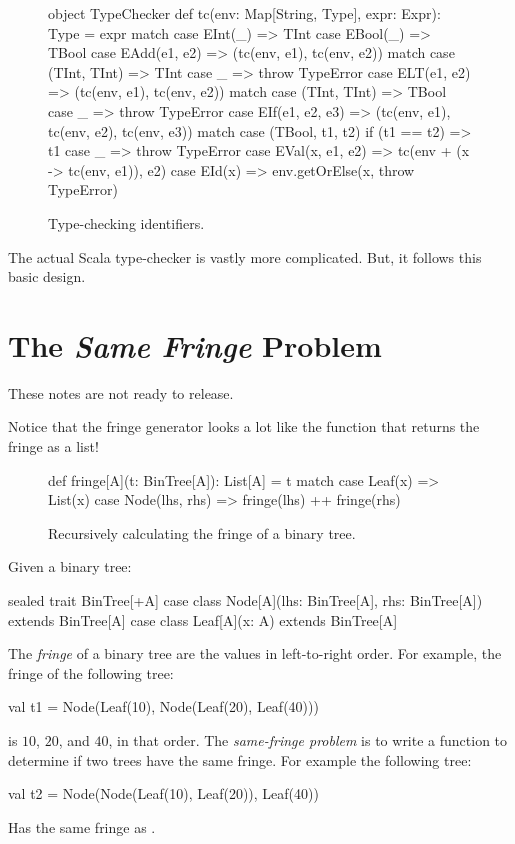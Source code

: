 \documentclass{book}
\begin{document}
\begin{figure}
\begin{scalacode}
object TypeChecker {
  def tc(env: Map[String, Type], expr: Expr): Type = expr match {
    case EInt(_) => TInt
    case EBool(_) => TBool
    case EAdd(e1, e2) => (tc(env, e1), tc(env, e2)) match {
      case (TInt, TInt) => TInt
      case _ => throw TypeError
    }
    case ELT(e1, e2) => (tc(env, e1), tc(env, e2)) match {
      case (TInt, TInt) => TBool
      case _ => throw TypeError
    }
    case EIf(e1, e2, e3) => (tc(env, e1), tc(env, e2), tc(env, e3)) match {
      case (TBool, t1, t2) if (t1 == t2) => t1
      case _ => throw TypeError
    }
    case EVal(x, e1, e2) => tc(env + (x -> tc(env, e1)), e2)
    case EId(x) => env.getOrElse(x, throw TypeError)
  }
}
\end{scalacode}
\caption{Type-checking identifiers.}\label{tcid}
\end{figure}

The actual Scala type-checker is vastly more complicated. But, it follows
this basic design.

\newlecture


\section{The \emph{Same Fringe} Problem}

\begin{instructor}
These notes are not ready to release.

Notice that the fringe generator looks a lot like the function that returns the fringe as a list!	
\end{instructor}


\begin{figure}
\begin{scalacode}
def fringe[A](t: BinTree[A]): List[A] = t match {
  case Leaf(x) => List(x)
  case Node(lhs, rhs) => fringe(lhs) ++ fringe(rhs)
}
\end{scalacode}
\caption{Recursively calculating the fringe of a binary tree.}
\label{fringeRec}
\end{figure}

Given a binary tree:

\begin{scalacode}
sealed trait BinTree[+A]
case class Node[A](lhs: BinTree[A], rhs: BinTree[A]) extends BinTree[A]
case class Leaf[A](x: A) extends BinTree[A]
\end{scalacode}

The \emph{fringe} of a binary tree are the values in left-to-right order. For
example, the fringe of the following tree:
\begin{scalacode}
val t1 = Node(Leaf(10), Node(Leaf(20), Leaf(40)))
\end{scalacode}
is $10$, $20$, and $40$, in that order. The \emph{same-fringe problem} is to write
a function to determine if two trees have the same fringe. For
example the following tree:
%
\begin{scalacode}
val t2 = Node(Node(Leaf(10), Leaf(20)), Leaf(40))
\end{scalacode}
Has the same fringe as .
\end{document}
